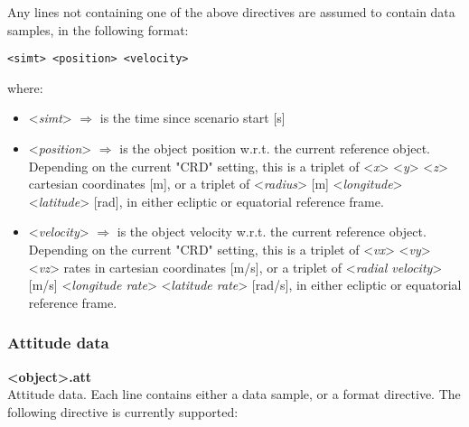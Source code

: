 \documentclass[Orbiter Technical Reference.tex]{subfiles}
\begin{document}
\noindent
Any lines not containing one of the above directives are assumed to contain data samples, in the following format:

\begin{lstlisting}[language=OSFS]
<simt> <position> <velocity>
\end{lstlisting}

\noindent
where:

\begin{itemize}
\item <\textit{simt}> $\Rightarrow$ is the time since scenario start [s]
\item <\textit{position}> $\Rightarrow$ is the object position w.r.t. the current reference object. Depending on the current "CRD" setting, this is a triplet of <\textit{x}> <\textit{y}> <\textit{z}> cartesian coordinates [m], or a triplet of <\textit{radius}> [m]  <\textit{longitude}> <\textit{latitude}> [rad], in either ecliptic or equatorial reference frame.
\item <\textit{velocity}> $\Rightarrow$ is the object velocity w.r.t. the current reference object. Depending on the current "CRD" setting, this is a triplet of <\textit{vx}> <\textit{vy}> <\textit{vz}> rates in cartesian coordinates [m/s], or a triplet of <\textit{radial velocity}> [m/s] <\textit{longitude rate}> <\textit{latitude rate}> [rad/s], in either ecliptic or equatorial reference frame.
\end{itemize}

\subsubsection{Attitude data}
\textbf{<object>.att}\\
Attitude data. Each line contains either a data sample, or a format directive. The following directive is currently supported:
\end{document}
